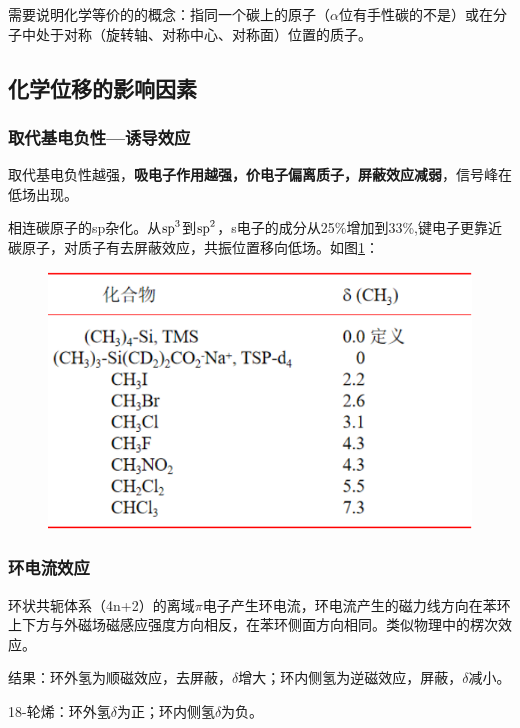 需要说明化学等价的的概念：指同一个碳上的原子（$\alpha$位有手性碳的不是）或在分子中处于对称（旋转轴、对称中心、对称面）位置的质子。


\subsection{化学位移的影响因素}
\subsubsection{取代基电负性—诱导效应}
取代基电负性越强，\textbf{吸电子作用越强，价电子偏离质子，屏蔽效应减弱}，信号峰在低场出现。

\begin{example}
	相连碳原子的sp杂化。从$\ce{sp^3}$到$\ce{sp^2}$，s电子的成分从25\%增加到33\%,键电子更靠近碳原子，对质子有去屏蔽效应，共振位置移向低场。如图\ref{fig:chp61hnmrx}：
\begin{figure}[!h]
	\centering
	\includegraphics[width=0.5\linewidth]{image/chp6_1HNMR_X}
	\label{fig:chp61hnmrx}
\end{figure}
\end{example}

\subsubsection{环电流效应}
环状共轭体系（4n+2）的离域$\pi$电子产生环电流，环电流产生的磁力线方向在苯环上下方与外磁场磁感应强度方向相反，在苯环侧面方向相同。类似物理中的楞次效应。

结果：环外氢为顺磁效应，去屏蔽，$\delta$增大；环内侧氢为逆磁效应，屏蔽，$\delta$减小。

\begin{example}
18-轮烯：环外氢$\delta$为正；环内侧氢$\delta$为负。

\begin{figure}[!h]
	\centering
	\quad
\end{figure}

\end{example}

